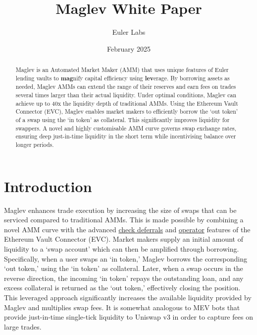 \documentclass{article}
\title{Maglev White Paper}
\author{Euler Labs}  %
\date{February 2025}
\begin{document}
\maketitle

\begin{abstract}
    Maglev is an Automated Market Maker (AMM) that uses unique features of Euler lending vaults to \textbf{mag}nify capital efficiency using \textbf{lev}erage. By borrowing assets as needed, Maglev AMMs can extend the range of their reserves and earn fees on trades several times larger than their actual liquidity. Under optimal conditions, Maglev can achieve up to 40x the liquidity depth of traditional AMMs. Using the Ethereum Vault Connector (EVC), Maglev enables market makers to efficiently borrow the `out token' of a swap using the `in token' as collateral. This significantly improves liquidity for swappers. A novel and highly customisable AMM curve governs swap exchange rates, ensuring deep just-in-time liquidity in the short term while incentivising balance over longer periods.
\end{abstract}

\section{Introduction}

Maglev enhances trade execution by increasing the size of swaps that can be serviced compared to traditional AMMs. This is made possible by combining a novel AMM curve with the advanced \href{https://docs.euler.finance/developers/evc/keyConcepts?_highlight=operator#batch-operations}{check deferrals} and \href{https://docs.euler.finance/developers/evc/keyConcepts?_highlight=operator#operators}{operator} features of the Ethereum Vault Connector (EVC). Market makers supply an initial amount of liquidity to a `swap account' which can then be amplified through borrowing. Specifically, when a user swaps an `in token,' Maglev borrows the corresponding `out token,' using the `in token' as collateral. Later, when a swap occurs in the reverse direction, the incoming `in token' repays the outstanding loan, and any excess collateral is returned as the `out token,' effectively closing the position. This leveraged approach significantly increases the available liquidity provided by Maglev and multiplies swap fees. It is somewhat analogous to MEV bots that provide just-in-time single-tick liquidity to Uniswap v3 in order to capture fees on large trades.
\end{document}
